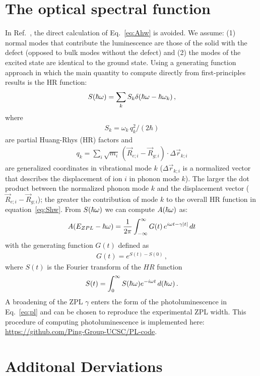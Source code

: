 \section{The optical spectral function}
In Ref.~\cite{alkauskas2014first1}, the direct calculation of Eq.~\ref{eq:Ahw} is avoided. We assume: (1) normal modes that contribute the luminescence are those of the solid with the defect (opposed to bulk modes without the defect) and (2) the modes of the excited state are identical to the ground state. Using a generating function approach in which the main quantity to compute directly from first-principles results is the HR function:
\begin{align}
    S(\hbar\omega) = \sum_k S_k \delta(\hbar\omega - \hbar\omega_k)\, ,
    \label{eq:Shw}
\end{align}
where
\begin{align}
    S_k = \omega_k \, q_k^2 /(2\hbar)
\end{align}
are partial Huang-Rhys (HR) factors and
\begin{align}
    q_k = \sum_i \sqrt{m_i} \, (\vec{R}_{e;i} - \vec{R}_{g;i}) \cdot \Delta \vec{r}_{k;i}
\end{align}
are generalized coordinates in vibrational mode $k$ ($\Delta \vec{r}_{k;i}$ is a normalized vector that describes the displacement of ion $i$ in phonon mode $k$). The larger the dot product between the normalized phonon mode $k$ and the displacement vector ($\vec{R}_{e;i} - \vec{R}_{g;i}$); the greater the contribution of mode $k$ to the overall HR function in equation~\ref{eq:Shw}. From $S(\hbar\omega)$ we can compute $A(\hbar\omega)$ as:
\begin{align}
    A(E_{ZPL} - \hbar\omega) = \frac{1}{2\pi} \int_{-\infty}^{\infty}
        G(t)\, e^{i\omega t -\gamma |t|} \, dt
    \label{eq:pl}
\end{align}
with the generating function $G(t)$ defined as
\begin{align}
    G(t) = e^{S(t) - S(0)}\, ,
\end{align}
where $S(t)$ is the Fourier transform of the $HR$ function
\begin{align}
    S(t) = \int_{0}^{\infty} S(\hbar\omega) e^{-i\omega t} \, d(\hbar\omega)\, .
\end{align}
A broadening of the ZPL $\gamma$ enters the form of the photoluminescence in Eq.~\ref{eq:pl} and can be chosen to reproduce the experimental ZPL width.
This procedure of computing photoluminescence is implemented here: \url{https://github.com/Ping-Group-UCSC/PL-code}.


\section{Additonal Derviations}

